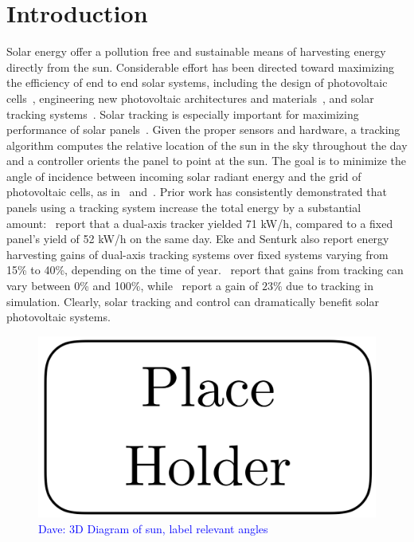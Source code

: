 \documentclass{article}
\newcommand{\dnote}[1]{\textcolor{blue}{Dave: #1}}
\begin{document}
\section{Introduction}
Solar energy offer a pollution free and sustainable means of harvesting energy directly from the sun. Considerable effort has been directed toward maximizing the efficiency of end to end solar systems, including the design of photovoltaic cells~\cite{Jervase2001,li2012molecular}, engineering new photovoltaic architectures and materials~\cite{li2005high}, and solar tracking systems~\cite{camacho2012control}. Solar tracking is especially important for maximizing performance of solar panels~\cite{Eke2012,Rizk2008,King2001}. Given the proper sensors and hardware, a tracking algorithm computes the relative location of the sun in the sky throughout the day and a controller orients the panel to point at the sun. The goal is to minimize the angle of incidence between incoming solar radiant energy and the grid of photovoltaic cells, as in~\citet{Eke2012,Benghanem2011,King2001} and~\citet{kalogirou1996design}. Prior work has consistently demonstrated that panels using a tracking system increase the total energy by a substantial amount:~\citet{Eke2012} report that a dual-axis tracker yielded 71 kW/h, compared to a fixed panel's yield of 52 kW/h on the same day. Eke and Senturk also report energy harvesting gains of dual-axis tracking systems over fixed systems varying from 15\% to 40\%, depending on the time of year.~\citet{mousazadeh2009review} report that gains from tracking can vary between 0\% and 100\%, while~\citet{clifford2004design} report a gain of $23\%$ due to tracking in simulation. Clearly, solar tracking and control can dramatically benefit solar photovoltaic systems.

\begin{figure}[t]
\begin{center}
\includegraphics[scale=0.3]{figures/placeholder.png}
\caption{\dnote{3D Diagram of sun, label relevant angles}}
\end{center}
\end{figure}
\end{document}
